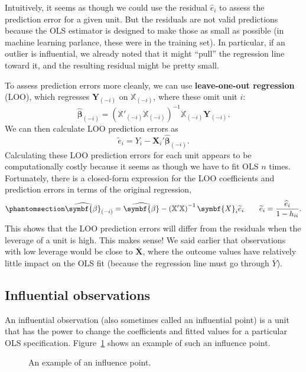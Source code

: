 \documentclass[
  13pt,
  letterpaper,
  DIV=11,
  numbers=noendperiod]{scrreprt}
\newcommand{\mb}{\symbf}
\newcommand{\X}{\mb{X}}
\newcommand{\Xmat}{\mathbb{X}}
\newcommand{\bhat}{\widehat{\mb{\beta}}}
\theoremstyle{definition}
\theoremstyle{definition}
\theoremstyle{plain}
\theoremstyle{remark}
\begin{document}
Intuitively, it seems as though we could use the residual
\(\widehat{e}_i\) to assess the prediction error for a given unit. But
the residuals are not valid predictions because the OLS estimator is
designed to make those as small as possible (in machine learning
parlance, these were in the training set). In particular, if an outlier
is influential, we already noted that it might ``pull'' the regression
line toward it, and the resulting residual might be pretty small.

To assess prediction errors more cleanly, we can use
\textbf{leave-one-out regression} (LOO), which regresses
\(\mb{Y}_{(-i)}\) on \(\Xmat_{(-i)}\), where these omit unit \(i\): \[ 
\bhat_{(-i)} = \left(\Xmat'_{(-i)}\Xmat_{(-i)}\right)^{-1}\Xmat_{(-i)}\mb{Y}_{(-i)}.
\] We can then calculate LOO prediction errors as \[ 
\widetilde{e}_{i} = Y_{i} - \X_{i}'\bhat_{(-i)}.
\] Calculating these LOO prediction errors for each unit appears to be
computationally costly because it seems as though we have to fit OLS
\(n\) times. Fortunately, there is a closed-form expression for the LOO
coefficients and prediction errors in terms of the original regression,
\begin{equation}\phantomsection\label{eq-loo-coefs}{ 
\bhat_{(-i)} = \bhat - \left( \Xmat'\Xmat\right)^{-1}\X_i\widetilde{e}_i \qquad \widetilde{e}_i = \frac{\widehat{e}_i}{1 - h_{ii}}.
}\end{equation} This shows that the LOO prediction errors will differ
from the residuals when the leverage of a unit is high. This makes
sense! We said earlier that observations with low leverage would be
close to \(\overline{\X}\), where the outcome values have relatively
little impact on the OLS fit (because the regression line must go
through \(\overline{Y}\)).

\subsection{Influential observations}\label{influential-observations}

An influential observation (also sometimes called an influential point)
is a unit that has the power to change the coefficients and fitted
values for a particular OLS specification. Figure~\ref{fig-influence}
shows an example of such an influence point.

\begin{figure}[th]


\caption{\label{fig-influence}An example of an influence point.}

\end{figure}%
\end{document}
